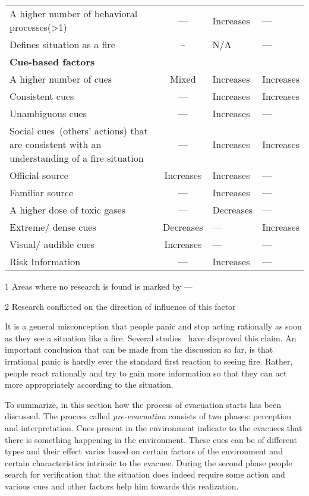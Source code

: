 \begin{table}[htbp]
\begin{threeparttable}[b]
\begin{tabular}{m{6.3cm} c >{\centering\arraybackslash}m{2.8cm} >{\centering\arraybackslash}m{2.8cm}}
A higher number of behavioral processes(>1) & --- & Increases & --- \\
Defines situation as a fire & -- & N/A & --- \\
\midrule
\multicolumn {4}{l}{{\bf Cue-based factors}}\\
\midrule
A higher number of cues & Mixed\tnote{2} & Increases & Increases \\
Consistent cues & --- & Increases & Increases \\
Unambiguous cues & --- & Increases & --- \\
Social cues~(others' actions) that are consistent with an understanding of a fire situation & --- & Increases & Increases \\
Official source & Increases & Increases &---\\
Familiar source & --- & Increases &--- \\
A higher dose of toxic gases & --- & Decreases & --- \\
Extreme/ dense cues & Decreases & --- & Increases \\
Visual/ audible cues & Increases & --- & --- \\
Risk Information & --- & Increases & --- \\
\bottomrule
\end{tabular}
\begin{tablenotes}
\item[1]{Areas where no research is found is marked by ---}
\item[2]{Research conflicted on the direction of influence of this factor}
\end{tablenotes}
\label{tab:Cues}
\end{threeparttable}
\end{table}

It is a general misconception that people panic and stop acting rationally as soon as they see a situation like a fire. Several studies~\cite{Kobes:2009jx,Schadschneider:2008cz,Reicher:2008ep,Torres:2010tj,Paulsen:1984ti,Sime:1983uy} have disproved this claim. An important conclusion that can be made from the discussion so far, is that irrational panic is hardly ever the standard first reaction to seeing fire. Rather, people react rationally and try to gain more information so that they can act more appropriately according to the situation.

To summarize, in this section how the process of evacuation starts has been discussed. The process called \emph{pre-evacuation} consists of two phases: perception and interpretation. Cues present in the environment indicate to the evacuees that there is something happening in the environment. These cues can be of different types and their effect varies based on certain factors of the environment and certain characteristics intrinsic to the evacuee. During the second phase people search for verification that the situation does indeed require some action and various cues and other factors help him towards this realization.  %


